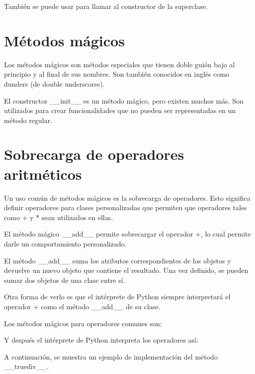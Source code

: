 \documentclass{report}
\begin{document}
{

También se puede usar para llamar al constructor de la superclase.


\section{Métodos mágicos}

Los métodos mágicos son métodos especiales que tienen doble guión bajo al principio y al final de sus nombres. Son también conocidos en inglés como dunders (de double underscores).

El constructor \_\_init\_\_ es un método mágico, pero existen muchos más. Son utilizados para crear funcionalidades que no pueden ser representadas en un método regular.

\section{Sobrecarga de operadores aritméticos}

Un uso común de métodos mágicos es la sobrecarga de operadores. Esto significa definir operadores para clases personalizadas que permiten que operadores tales como + y * sean utilizados en ellas.

El método mágico \_\_add\_\_ permite sobrecargar el operador +, lo cual permite darle un comportamiento personalizado.


El método \_\_add\_\_ suma los atributos correspondientes de los objetos y devuelve un nuevo objeto que contiene el resultado. Una vez definido, se pueden sumar dos objetos de una clase entre sí.

Otra forma de verlo es que el intérprete de Python siempre interpretará el operador + como el método \_\_add\_\_ de su clase.

Los métodos mágicos para operadores comunes son:


Y después el intérprete de Python interpreta los operadores así:


A continuación, se muestra un ejemplo de implementación del método \_\_truediv\_\_.

}
\end{document}
